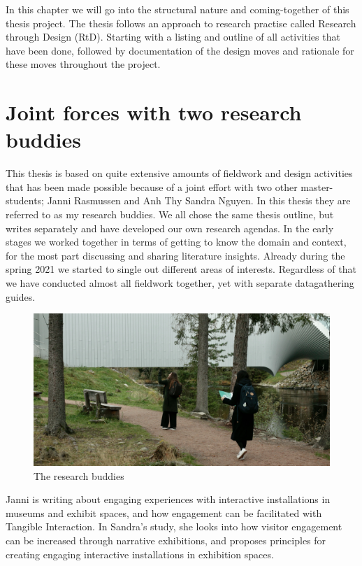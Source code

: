 In this chapter we will go into the structural nature and coming-together of this thesis project. The thesis follows an approach to research practise called Research through Design (RtD). Starting with a listing and outline of all activities that have been done, followed by documentation of the design moves and rationale for these moves throughout the project.


\section{Joint forces with two research buddies}
This thesis is based on quite extensive amounts of fieldwork and design activities that has been made possible because of a joint effort with two other master-students; Janni Rasmussen and Anh Thy Sandra Nguyen. In this thesis they are referred to as my research buddies. We all chose the same thesis outline, but writes separately and have developed our own research agendas. In the early stages we worked together in terms of getting to know the domain and context, for the most part discussing and sharing literature insights. Already during the spring 2021 we started to single out different areas of interests. Regardless of that we have conducted almost all fieldwork together, yet with separate datagathering guides.

\begin{figure}[H]
\includegraphics[width=12.3cm]{pictures/methodology/buddies.JPG}
\caption{The research buddies}
\centering 
\end{figure}

Janni is writing about engaging experiences with interactive installations in museums and exhibit spaces, and how engagement can be facilitated with Tangible Interaction. In Sandra's study, she looks into how visitor engagement can be increased through narrative exhibitions, and proposes principles for creating engaging interactive installations in exhibition spaces.


